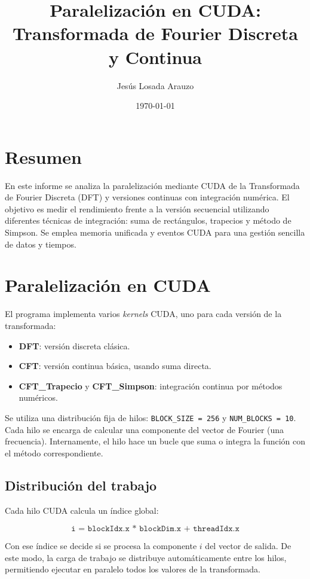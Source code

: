\documentclass[12pt]{article}
\title{Paralelización en CUDA: Transformada de Fourier Discreta y Continua}
\author{Jesús Losada Arauzo}
\date{\today}
\begin{document}
\maketitle

\section*{Resumen}

En este informe se analiza la paralelización mediante CUDA de la Transformada de Fourier Discreta (DFT) y versiones continuas con integración numérica. El objetivo es medir el rendimiento frente a la versión secuencial utilizando diferentes técnicas de integración: suma de rectángulos, trapecios y método de Simpson. Se emplea memoria unificada y eventos CUDA para una gestión sencilla de datos y tiempos.

\section*{Paralelización en CUDA}

El programa implementa varios \textit{kernels} CUDA, uno para cada versión de la transformada:

\begin{itemize}
    \item \textbf{DFT}: versión discreta clásica.
    \item \textbf{CFT}: versión continua básica, usando suma directa.
    \item \textbf{CFT\_Trapecio} y \textbf{CFT\_Simpson}: integración continua por métodos numéricos.
\end{itemize}

Se utiliza una distribución fija de hilos: \texttt{BLOCK\_SIZE = 256} y \texttt{NUM\_BLOCKS = 10}. Cada hilo se encarga de calcular una componente del vector de Fourier (una frecuencia). Internamente, el hilo hace un bucle que suma o integra la función con el método correspondiente.

\subsection*{Distribución del trabajo}

Cada hilo CUDA calcula un índice global:

\[
\texttt{i = blockIdx.x * blockDim.x + threadIdx.x}
\]

Con ese índice se decide si se procesa la componente \( i \) del vector de salida. De este modo, la carga de trabajo se distribuye automáticamente entre los hilos, permitiendo ejecutar en paralelo todos los valores de la transformada.
\end{document}
